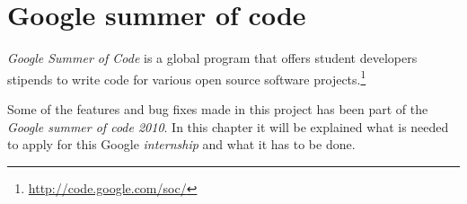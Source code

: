 
\chapter{Google summer of code}


\emph{Google Summer of Code} is a global program that offers student developers stipends to write code for various open source software projects.\footnote{\url{http://code.google.com/soc/}}

Some of the features and bug fixes made in this project has been part of the \emph{Google summer of code 2010}. In this chapter it will be explained what is needed to apply for this Google \emph{internship} and what it has to be done.



